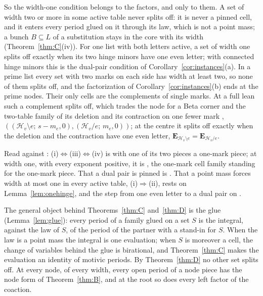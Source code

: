 \documentclass[11pt]{article}
\theoremstyle{plain}
\theoremstyle{definition}
\theoremstyle{remark}
\begin{document}
So the width-one condition belongs to the factors, and only to them. A set of width two or more in some active table never splits off: it is never a pinned cell, and it enters every period glued on it through its law, which is not a point mass; a bunch $B\subseteq L$ of a substitution stays in the core with its width (Theorem~\ref{thm:C}(iv)). For one list with both letters active, a set of width one splits off exactly when its two hinge minors have one even letter; with connected hinge minors this is the dual-pair condition of Corollary~\ref{cor:instances}(a). In a prime list every set with two marks on each side has width at least two, so none of them splits off, and the factorization of Corollary~\ref{cor:instances}(b) ends at the prime nodes. Their only cells are the complements of single marks. At a full lean such a complement splits off, which trades the node for a Beta corner and the two-table family of its deletion and its contraction on one fewer mark \cite[Cor.~18.14, p.~121]{F}, $((\mathcal H_v\setminus e;\,s-m_e,0),(\mathcal H_v/e;\,m_e,0))$; at the centre it splits off exactly when the deletion and the contraction have one even letter, $\mathbf E_{\mathcal H_v\setminus e}=\mathbf E_{\mathcal H_v/e}$.

Read against \cite{F}: (i)$\Leftrightarrow$(iii)$\Leftrightarrow$(iv) is \cite[Thm.~27.18, p.~235]{F} with one of its two pieces a one-mark piece; at width one, with every exponent positive, it is \cite[Thm.~22.7, Def.~22.6, p.~185; Cor.~22.8(i), p.~186]{F}, the one-mark cell family standing for the one-mark piece. That a dual pair is pinned is \cite[Cor.~22.8(ii), p.~186]{F}. That a point mass forces width at most one in every active table, (i)$\Rightarrow$(ii), rests on Lemma~\ref{lem:onehinge}, and the step from one even letter to a dual pair on \cite[Thm.~7.9, p.~49; Thm.~10.6, p.~65]{F}.

The general object behind Theorems~\ref{thm:C} and~\ref{thm:D} is the glue (Lemma~\ref{lem:glue}): every period of a family glued on a set $S$ is the integral, against the law of $S$, of the period of the partner with a stand-in for $S$. When the law is a point mass the integral is one evaluation; when $S$ is moreover a cell, the change of variables behind the glue is birational, and Theorem~\ref{thm:C} makes the evaluation an identity of motivic periods. By Theorem~\ref{thm:D} no other set splits off. At every node, of every width, every open period of a node piece has the node form of Theorem~\ref{thm:B}, and at the root so does every left factor of the coaction.
\end{document}
